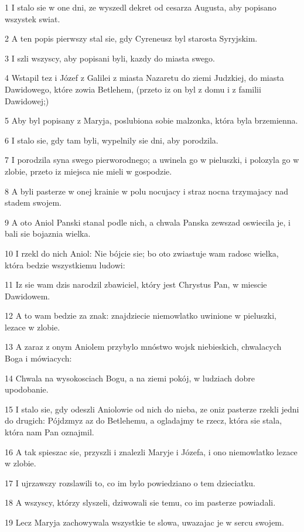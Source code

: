 \par 1 I stalo sie w one dni, ze wyszedl dekret od cesarza Augusta, aby popisano wszystek swiat.
\par 2 A ten popis pierwszy stal sie, gdy Cyreneusz byl starosta Syryjskim.
\par 3 I szli wszyscy, aby popisani byli, kazdy do miasta swego.
\par 4 Wstapil tez i Józef z Galilei z miasta Nazaretu do ziemi Judzkiej, do miasta Dawidowego, które zowia Betlehem, (przeto iz on byl z domu i z familii Dawidowej;)
\par 5 Aby byl popisany z Maryja, poslubiona sobie malzonka, która byla brzemienna.
\par 6 I stalo sie, gdy tam byli, wypelnily sie dni, aby porodzila.
\par 7 I porodzila syna swego pierworodnego; a uwinela go w pieluszki, i polozyla go w zlobie, przeto iz miejsca nie mieli w gospodzie.
\par 8 A byli pasterze w onej krainie w polu nocujacy i straz nocna trzymajacy nad stadem swojem.
\par 9 A oto Aniol Panski stanal podle nich, a chwala Panska zewszad oswiecila je, i bali sie bojaznia wielka.
\par 10 I rzekl do nich Aniol: Nie bójcie sie; bo oto zwiastuje wam radosc wielka, która bedzie wszystkiemu ludowi:
\par 11 Iz sie wam dzis narodzil zbawiciel, który jest Chrystus Pan, w miescie Dawidowem.
\par 12 A to wam bedzie za znak: znajdziecie niemowlatko uwinione w pieluszki, lezace w zlobie.
\par 13 A zaraz z onym Aniolem przybylo mnóstwo wojsk niebieskich, chwalacych Boga i mówiacych:
\par 14 Chwala na wysokosciach Bogu, a na ziemi pokój, w ludziach dobre upodobanie.
\par 15 I stalo sie, gdy odeszli Aniolowie od nich do nieba, ze oniz pasterze rzekli jedni do drugich: Pójdzmyz az do Betlehemu, a ogladajmy te rzecz, która sie stala, która nam Pan oznajmil.
\par 16 A tak spieszac sie, przyszli i znalezli Maryje i Józefa, i ono niemowlatko lezace w zlobie.
\par 17 I ujrzawszy rozslawili to, co im bylo powiedziano o tem dzieciatku.
\par 18 A wszyscy, którzy slyszeli, dziwowali sie temu, co im pasterze powiadali.
\par 19 Lecz Maryja zachowywala wszystkie te slowa, uwazajac je w sercu swojem.
